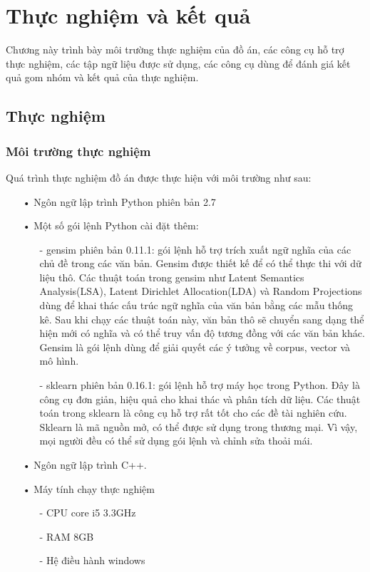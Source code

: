 \chapter{Thực nghiệm và kết quả}
\label{Chapter4}
Chương này trình bày môi trường thực nghiệm của đồ án, các công cụ hỗ trợ thực nghiệm, các tập ngữ liệu được sử dụng, các công cụ dùng để đánh giá kết quả gom nhóm và kết quả của thực nghiệm.

\section{Thực nghiệm}
\subsection{Môi trường thực nghiệm}
Quá trình thực nghiệm đồ án được thực hiện với môi trường như sau:
\begin{enumerate}
\item[•]Ngôn ngữ lập trình Python phiên bản 2.7
\item[•]Một số gói lệnh Python cài đặt thêm:
\begin{enumerate}
\item[-] gensim phiên bản 0.11.1: gói lệnh hỗ trợ trích xuất ngữ nghĩa của các chủ đề trong các văn bản.
Gensim được thiết kế để có thể thực thi với dữ liệu thô.
Các thuật toán trong gensim như Latent Semantics Analysis(LSA), Latent Dirichlet Allocation(LDA) và Random Projections dùng để khai thác cấu trúc ngữ nghĩa của văn bản bằng các mẫu thống kê.
Sau khi chạy các thuật toán này, văn bản thô sẽ chuyển sang dạng thể hiện mới có nghĩa và có thể truy vấn độ tương đồng với các văn bản khác.
Gensim là gói lệnh dùng để giải quyết các ý tưởng về corpus, vector và mô hình.
\item[-] sklearn phiên bản 0.16.1: gói lệnh hỗ trợ máy học trong Python.
Đây là công cụ đơn giản, hiệu quả cho khai thác và phân tích dữ liệu.
Các thuật toán trong sklearn là công cụ hỗ trợ rất tốt cho các đề tài nghiên cứu.
Sklearn là mã nguồn mở, có thể được sử dụng trong thương mại.
Vì vậy, mọi người đều có thể sử dụng gói lệnh và chỉnh sửa thoải mái.
\end{enumerate}
\item[•]Ngôn ngữ lập trình C++.
\item[•]Máy tính chạy thực nghiệm
\begin{enumerate}
\item[-]CPU core i5 3.3GHz
\item[-]RAM 8GB
\item[-]Hệ điều hành windows
\end{enumerate}
\end{enumerate}

